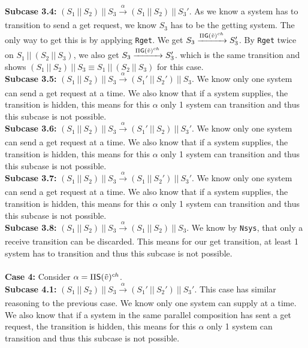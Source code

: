 \indent \textbf{Subcase 3.4: }$(S_1 \ || \ S_2)\ ||\ S_3 \xrightarrow[]{\alpha} (S_1 \ || \ S_2)\ ||\ S_3'$. As we know a system has to transition to send a get request, we know $S_3$ has to be the getting system. The only way to get this is by applying \texttt{Rget}. We get $S_3\xrightarrow[]{\Pi \mathsf{G}(\Tilde{v})^{ch}} S_3'$. By \texttt{Rget} twice on $S_1 \ ||\ (S_2 \ || \ S_3)$, we also get $S_3\xrightarrow[]{\Pi \mathsf{G}(\Tilde{v})^{ch}} S_3'$. which is the same transition and shows $(S_1 \ ||\ S_2 )\ || \ S_3 \equiv S_1 \ ||\ (S_2 \ || \ S_3)$ for this case.\\
\indent \textbf{Subcase 3.5: }$(S_1 \ || \ S_2)\ ||\ S_3 \xrightarrow[]{\alpha} (S_1' \ || \ S_2')\ ||\ S_3$. We know only one system can send a get request at a time. We also know that if a system supplies, the transition is hidden, this means for this $\alpha$ only 1 system can transition and thus this subcase is not possible.\\
\indent \textbf{Subcase 3.6: }$(S_1 \ || \ S_2)\ ||\ S_3 \xrightarrow[]{\alpha} (S_1' \ || \ S_2)\ ||\ S_3'$. We know only one system can send a get request at a time. We also know that if a system supplies, the transition is hidden, this means for this $\alpha$ only 1 system can transition and thus this subcase is not possible.\\
\indent \textbf{Subcase 3.7: }$(S_1 \ || \ S_2)\ ||\ S_3 \xrightarrow[]{\alpha} (S_1 \ || \ S_2')\ ||\ S_3'$. We know only one system can send a get request at a time. We also know that if a system supplies, the transition is hidden, this means for this $\alpha$ only 1 system can transition and thus this subcase is not possible.\\
\indent \textbf{Subcase 3.8: }$(S_1 \ || \ S_2)\ ||\ S_3 \xrightarrow[]{\alpha} (S_1 \ || \ S_2)\ ||\ S_3$. We know by \texttt{Nsys}, that only a receive transition can be discarded. This means for our get transition, at least 1 system has to transition and thus this subcase is not possible.\\
\\
\textbf{Case 4: } Consider $\alpha = \Pi \mathsf{S}(\Tilde{v})^{ch}$.\\
\indent \textbf{Subcase 4.1: }$(S_1 \ || \ S_2)\ ||\ S_3 \xrightarrow[]{\alpha} (S_1' \ || \ S_2')\ ||\ S_3'$. This case has similar reasoning to the previous case. We know only one system can supply at a time. We also know that if a system in the same parallel composition has sent a get request, the transition is hidden, this means for this $\alpha$ only 1 system can transition and thus this subcase is not possible.\\
